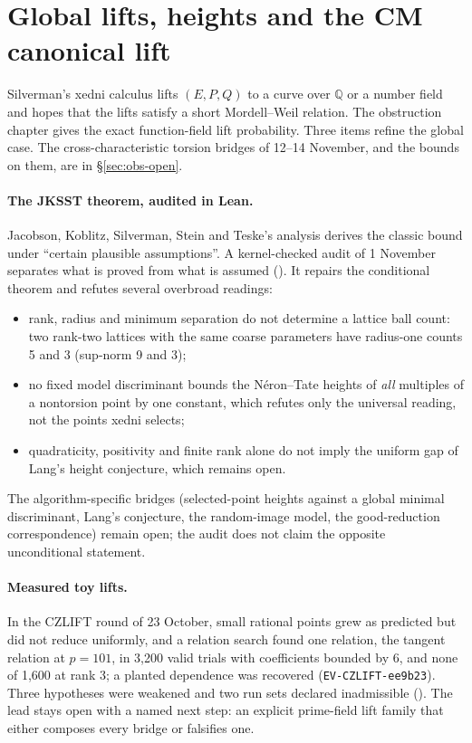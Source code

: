 \section{Global lifts, heights and the CM canonical lift}\label{sec:tp-global}

Silverman's xedni calculus lifts $(E,P,Q)$ to a curve over $\mathbb{Q}$ or a
number field and hopes that the lifts satisfy a short Mordell--Weil
relation. The obstruction chapter gives the exact function-field lift
probability. Three items refine the global case. The cross-characteristic
torsion bridges of 12--14 November, and the bounds on them, are in
\S\ref{sec:obs-open}.

\paragraph{The JKSST theorem, audited in Lean.} Jacobson, Koblitz,
Silverman, Stein and Teske's analysis derives the classic bound under
``certain plausible assumptions''. A kernel-checked audit of 1 November
separates what is proved from what is assumed
(). It repairs the
conditional theorem and refutes several overbroad readings:
\begin{itemize}
\item rank, radius and minimum separation do not determine a lattice ball
  count: two rank-two lattices with the same coarse parameters have
  radius-one counts 5 and 3 (sup-norm 9 and 3);
\item no fixed model discriminant bounds the N\'eron--Tate heights of
  \emph{all} multiples of a nontorsion point by one constant, which refutes
  only the universal reading, not the points xedni selects;
\item quadraticity, positivity and finite rank alone do not imply the
  uniform gap of Lang's height conjecture, which remains open.
\end{itemize}
The algorithm-specific bridges (selected-point heights against a global
minimal discriminant, Lang's conjecture, the random-image model, the
good-reduction correspondence) remain open; the audit does not claim the
opposite unconditional statement.

\paragraph{Measured toy lifts.} In the CZLIFT round of 23 October, small
rational points grew as predicted but did not reduce uniformly, and a
relation search found one relation, the tangent relation at $p=101$, in
3{,}200 valid trials with coefficients bounded by 6, and none of 1{,}600 at
rank 3; a planted dependence was recovered
(\texttt{EV-CZLIFT-ee9b23}). Three hypotheses were weakened and two run sets
declared inadmissible
().
The lead stays open with a named next step: an explicit prime-field lift
family that either composes every bridge or falsifies one.

